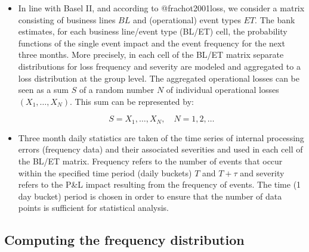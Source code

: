 \documentclass[]{article}
\begin{document}
\begin{itemize}
\item In line with Basel II, and according to @frachot2001loss, we consider a matrix consisting of business lines $BL$ and (operational) event types $ET$. The bank estimates, for each business line/event type (BL/ET) cell, the probability functions of the single event impact and the event frequency for the next three months. More precisely, in each cell of the BL/ET matrix separate distributions for loss frequency and severity are modeled and aggregated to a loss distribution at the group level. The aggregated operational losses can be seen as a sum $S$ of a random number $N$ of individual operational losses \begin{math} (X_1, \ldots, X_N )\end{math}. This sum can be represented by:

\singlespacing
\begin{equation}\label{eqn1}
S = X_1, \ldots, X_N ,\quad N = 1, 2, \ldots 
\end{equation}
\doublespacing

\item Three month daily statistics are taken of the time series of internal processing errors (frequency data) and their associated severities and used in each cell of the BL/ET matrix. Frequency refers to the number of events that occur within the specified time period (daily buckets) $T$ and $T + \tau$ and severity refers to the P\&L impact resulting from the frequency of events. The time (1 day bucket) period is chosen in order to ensure that the number of data points is sufficient for statistical analysis.
\end{itemize}

\subsection{Computing the frequency distribution}
\label{ssec:Computing the frequency distribution}
\end{document}
